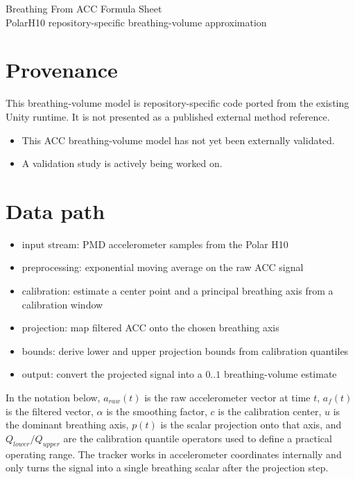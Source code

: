 \documentclass[11pt]{article}
\begin{document}
\begin{center}
{\LARGE Breathing From ACC Formula Sheet}\\[0.5em]
{\large PolarH10 repository-specific breathing-volume approximation}
\end{center}

\section*{Provenance}

This breathing-volume model is repository-specific code ported from the existing
Unity runtime. It is not presented as a published external method reference.

\begin{itemize}[leftmargin=1.5em]
\item This ACC breathing-volume model has not yet been externally validated.
\item A validation study is actively being worked on.
\end{itemize}

\section*{Data path}

\begin{itemize}[leftmargin=1.5em]
\item input stream: PMD accelerometer samples from the Polar H10
\item preprocessing: exponential moving average on the raw ACC signal
\item calibration: estimate a center point and a principal breathing axis from a calibration window
\item projection: map filtered ACC onto the chosen breathing axis
\item bounds: derive lower and upper projection bounds from calibration quantiles
\item output: convert the projected signal into a $0..1$ breathing-volume estimate
\end{itemize}

In the notation below, $a_{raw}(t)$ is the raw accelerometer vector at time
$t$, $a_f(t)$ is the filtered vector, $\alpha$ is the smoothing factor, $c$ is
the calibration center, $u$ is the dominant breathing axis, $p(t)$ is the
scalar projection onto that axis, and $Q_{lower} / Q_{upper}$ are the
calibration quantile operators used to define a practical operating range. The
tracker works in accelerometer coordinates internally and only turns the signal
into a single breathing scalar after the projection step.
\end{document}
